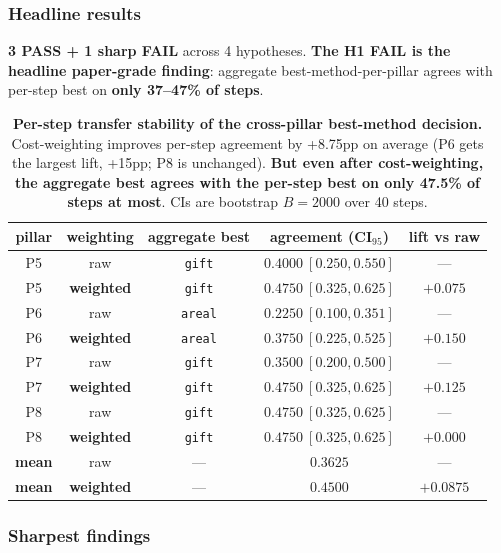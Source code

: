 \subsubsection{Headline results}\label{sec:synth-d23-results}
\textbf{3 PASS + 1 sharp FAIL} across 4 hypotheses. \textbf{The H1 FAIL
is the headline paper-grade finding}: aggregate best-method-per-pillar
agrees with per-step best on \textbf{only 37--47\% of steps}.

\begin{table}[h]
\centering
\small
\begin{tabular}{ccccc}
\hline
pillar & weighting & aggregate best & agreement (CI$_{95}$) & lift vs raw \\
\hline
P5 & raw       & \texttt{gift}  & $0.4000\ [0.250, 0.550]$ & --- \\
P5 & \textbf{weighted} & \texttt{gift}  & $0.4750\ [0.325, 0.625]$ & $+0.075$ \\
P6 & raw       & \texttt{areal} & $0.2250\ [0.100, 0.351]$ & --- \\
P6 & \textbf{weighted} & \texttt{areal} & $0.3750\ [0.225, 0.525]$ & $\mathbf{+0.150}$ \\
P7 & raw       & \texttt{gift}  & $0.3500\ [0.200, 0.500]$ & --- \\
P7 & \textbf{weighted} & \texttt{gift}  & $0.4750\ [0.325, 0.625]$ & $+0.125$ \\
P8 & raw       & \texttt{gift}  & $0.4750\ [0.325, 0.625]$ & --- \\
P8 & \textbf{weighted} & \texttt{gift}  & $0.4750\ [0.325, 0.625]$ & $+0.000$ \\
\hline
\textbf{mean} & raw & --- & $0.3625$ & --- \\
\textbf{mean} & \textbf{weighted} & --- & $\mathbf{0.4500}$ & $\mathbf{+0.0875}$ \\
\hline
\end{tabular}
\caption{\textbf{Per-step transfer stability of the cross-pillar
best-method decision.} Cost-weighting improves per-step agreement by
+8.75pp on average (P6 gets the largest lift, +15pp; P8 is unchanged).
\textbf{But even after cost-weighting, the aggregate best agrees with
the per-step best on only 47.5\% of steps at most}. CIs are bootstrap
$B{=}2000$ over 40 steps.}
\label{tab:synth-d23-agree}
\end{table}

\subsubsection{Sharpest findings}\label{sec:synth-d23-findings}

